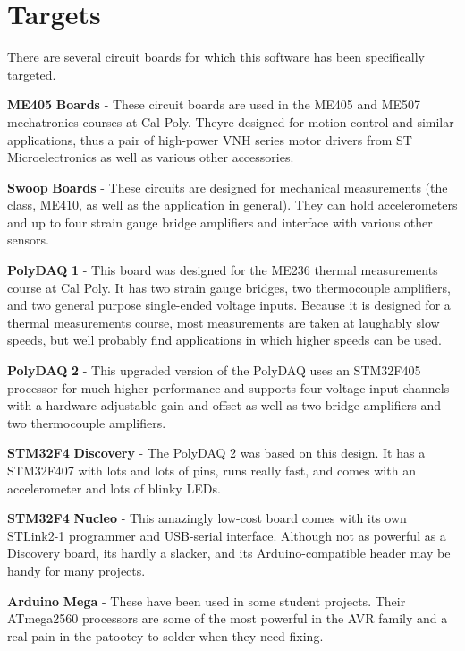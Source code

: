 \hypertarget{index_m_tarrrgh}{}\section{Targets}\label{index_m_tarrrgh}
There are several circuit boards for which this software has been specifically targeted. \begin{DoxyItemize}
\item {\bfseries M\+E405} {\bfseries Boards} -\/ These circuit boards are used in the M\+E405 and M\+E507 mechatronics courses at Cal Poly. They\textquotesingle{}re designed for motion control and similar applications, thus a pair of high-\/power V\+NH series motor drivers from ST Microelectronics as well as various other accessories. \item {\bfseries Swoop} {\bfseries Boards} -\/ These circuits are designed for mechanical measurements (the class, M\+E410, as well as the application in general). They can hold accelerometers and up to four strain gauge bridge amplifiers and interface with various other sensors. \item {\bfseries Poly\+D\+AQ} {\bfseries 1} -\/ This board was designed for the M\+E236 thermal measurements course at Cal Poly. It has two strain gauge bridges, two thermocouple amplifiers, and two general purpose single-\/ended voltage inputs. Because it is designed for a thermal measurements course, most measurements are taken at laughably slow speeds, but we\textquotesingle{}ll probably find applications in which higher speeds can be used. \item {\bfseries Poly\+D\+AQ} {\bfseries 2} -\/ This upgraded version of the Poly\+D\+AQ uses an S\+T\+M32\+F405 processor for much higher performance and supports four voltage input channels with a hardware adjustable gain and offset as well as two bridge amplifiers and two thermocouple amplifiers. \item {\bfseries S\+T\+M32\+F4} {\bfseries Discovery} -\/ The Poly\+D\+AQ 2 was based on this design. It has a S\+T\+M32\+F407 with lots and lots of pins, runs really fast, and comes with an accelerometer and lots of blinky L\+ED\textquotesingle{}s. \item {\bfseries S\+T\+M32\+F4} {\bfseries Nucleo} -\/ This amazingly low-\/cost board comes with its own S\+T\+Link2-\/1 programmer and U\+S\+B-\/serial interface. Although not as powerful as a Discovery board, it\textquotesingle{}s hardly a slacker, and its Arduino-\/compatible header may be handy for many projects. \item {\bfseries Arduino} {\bfseries Mega} -\/ These have been used in some student projects. Their A\+Tmega2560 processors are some of the most powerful in the A\+VR family and a real pain in the patootey to solder when they need fixing.\end{DoxyItemize}

